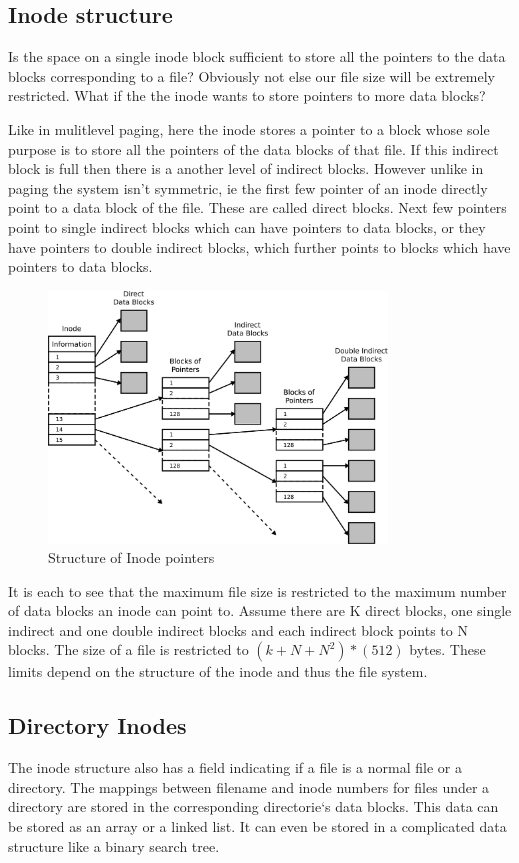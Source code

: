 \documentclass[12pt]{article}
\begin{document}
\subsection{Inode structure}

Is the space on a single inode block sufficient to store all the pointers to the data blocks corresponding to a file?
Obviously not else our file size will be extremely restricted. What if the the inode wants to store pointers to more data blocks?

Like in mulitlevel paging, here the inode stores a pointer to a block whose sole purpose is to store all the pointers of the data blocks of that file. If this indirect block is full 
then there is a another level of indirect blocks. However unlike in paging the system isn't symmetric, ie the first few pointer of an inode directly point to a data block of the file. These are called direct blocks. 
Next few pointers point to single indirect blocks which can have pointers to data blocks, or they have pointers to double indirect blocks, which further points to blocks which have pointers to data blocks. 

\begin{figure}[H]
    \centering
    \includegraphics[width = 9cm]{inode_pointer.png}
    \caption{Structure of Inode pointers}
\end{figure}

It is each to see that the maximum file size is restricted to the maximum number of data blocks an inode can point to. Assume there are K direct blocks, one single indirect and one double indirect blocks and each indirect block points to N blocks.
The size of a file is restricted to \((k + N + N^2)*(512)\) bytes. These limits depend on the structure of the inode and thus the file system. 

\subsection{Directory Inodes}
The inode structure also has a field indicating if a file is a normal file or a directory. The 
mappings between filename and inode numbers for files under a directory are stored in the corresponding directorie`s data blocks. 
This data can be stored as an array or a linked list. It can even be stored in a complicated data structure like a binary search tree. 
\end{document}
